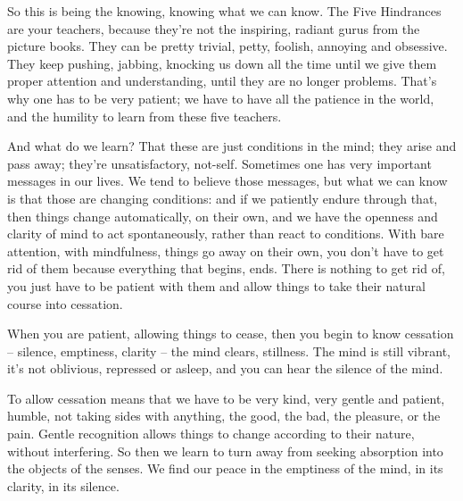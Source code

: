 So this is being the knowing, knowing what we can know. The Five Hindrances are your teachers, because they're not the inspiring, radiant gurus from the picture books. They can be pretty trivial, petty, foolish, annoying and obsessive. They keep pushing, jabbing, knocking us down all the time until we give them proper attention and understanding, until they are no longer problems. That's why one has to be very patient; we have to have all the patience in the world, and the humility to learn from these five teachers.

And what do we learn? That these are just conditions in the mind; they arise and pass away; they're unsatisfactory, not-self. Sometimes one has very important messages in our lives. We tend to believe those messages, but what we can know is that those are changing conditions: and if we patiently endure through that, then things change automatically, on their own, and we have the openness and clarity of mind to act spontaneously, rather than react to conditions. With bare attention, with mindfulness, things go away on their own, you don't have to get rid of them because everything that begins, ends. There is nothing to get rid of, you just have to be patient with them and allow things to take their natural course into cessation.

When you are patient, allowing things to cease, then you begin to know cessation -- silence, emptiness, clarity -- the mind clears, stillness. The mind is still vibrant, it's not oblivious, repressed or asleep, and you can hear the silence of the mind.

To allow cessation means that we have to be very kind, very gentle and patient, humble, not taking sides with anything, the good, the bad, the pleasure, or the pain. Gentle recognition allows things to change according to their nature, without interfering. So then we learn to turn away from seeking absorption into the objects of the senses. We find our peace in the emptiness of the mind, in its clarity, in its silence.


